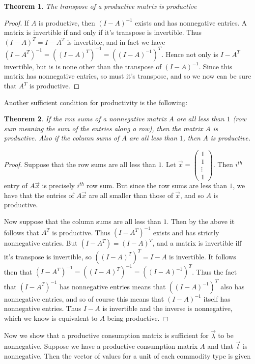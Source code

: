 \documentclass{article}
\theoremstyle{definition}
\theoremstyle{plain}
\theoremstyle{theorem}
\newtheorem{theorem}{Theorem}[section]
\begin{document}
\begin{theorem}
	The transpose of a productive matrix is productive
\end{theorem}
\begin{proof}
	If $A$ is productive, then $(I-A)^{-1}$ exists and has nonnegative entries. A matrix is invertible if and only if it's transpose is invertible. Thus $(I-A)^T = I-A^T$ is invertible, and in fact we have $(I-A^T)^{-1} = ((I-A)^T)^{-1} = ((I-A)^{-1})^T$. Hence not only is $I-A^T$ invertible, but is is none other than the transpose of $(I-A)^{-1}$. Since this matrix has nonnegative entries, so must it's transpose, and so we now can be sure that $A^T$ is productive. 
\end{proof}
Another sufficient condition for productivity is the following:
\begin{theorem}
	If the row sums of a nonnegative matrix $A$ are all less than $1$ (row sum meaning the sum of the entries along a row), then the matrix $A$ is productive. Also if the column sums of $A$ are all less than $1$, then $A$ is productive.
\end{theorem} 
\begin{proof}
	Suppose that the row sums are all less than $1$. Let $\vec{x} = \begin{pmatrix} 1 \\ 1 \\ \vdots \\ 1 \end{pmatrix}$. Then $i^{th}$ entry of $A\vec{x}$ is precisely $i^{th}$ row sum. But since the row sums are less than $1$, we have that the entries of $A\vec{x}$ are all smaller than those of $\vec{x}$, and so $A$ is productive. \par 
	Now suppose that the column sums are all less than $1$. Then by the above it follows that $A^T$ is productive. Thus $(I-A^T)^{-1}$ exists and has strictly nonnegative entries. But $(I-A^T) = (I-A)^T$, and a matrix is invertible iff it's transpose is invertible, so $((I-A)^T)^T = I-A$ is invertible. It follows then that $(I-A^T)^{-1} = ((I-A)^T)^{-1} = ((I-A)^{-1})^T$. Thus the fact that $(I-A^T)^{-1}$ has nonnegative entries means that $((I-A)^{-1})^T$ also has nonnegative entries, and so of course this means that $(I-A)^{-1}$ itself has nonnegative entries. Thus $I-A$ is invertible and the inverse is nonnegative, which we know is equivalent to $A$ being productive. 
\end{proof}
 Now we show that a productive consumption matrix is sufficient for $\vec{\lambda}$ to be nonnegative. Suppose we have a productive consumption matrix $A$ and that $\vec{l}$ is nonnegative. Then the vector of values for a unit of each commodity type is given
\end{document}
